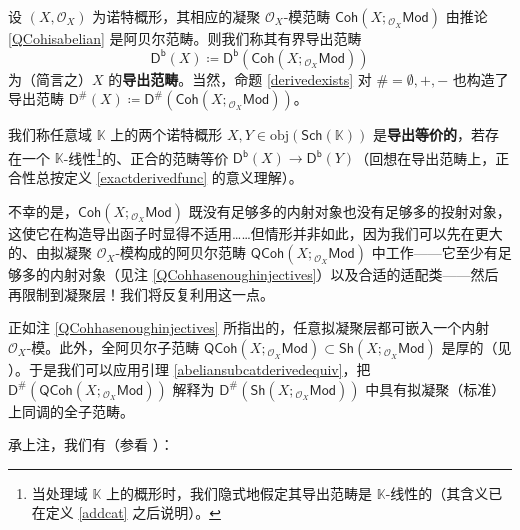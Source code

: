 \begin{Def}\label{dercatofsch}
设 $(X,\mathcal{O}_X)$ 为诺特概形，其相应的凝聚 $\mathcal{O}_X$-模范畴 $\mathsf{Coh}(X;{}_{\mathcal{O}_X}\!\mathsf{Mod})$ 由推论 \ref{QCohisabelian} 是阿贝尔范畴。则我们称其有界导出范畴
\[
\mathsf{D^b}(X)\coloneqq \mathsf{D^b}(\mathsf{Coh}(X;{}_{\mathcal{O}_X}\!\mathsf{Mod}))
\]
为（简言之）$X$ 的\textbf{导出范畴}。当然，命题 \ref{derivedexists} 对 $\#=\emptyset,+,-$ 也构造了导出范畴 $\mathsf{D^\#\!}(X)\coloneqq\mathsf{D^\#\!}(\mathsf{Coh}(X;{}_{\mathcal{O}_X}\!\mathsf{Mod}))$。

我们称任意域 $\mathbb{K}$ 上的两个诺特概形 $X,Y\in\text{obj}(\mathsf{Sch}(\mathbb{K}))$ 是\textbf{导出等价的}，若存在一个 $\mathbb{K}$-线性\footnote{当处理域 $\mathbb{K}$ 上的概形时，我们隐式地假定其导出范畴是 $\mathbb{K}$-线性的（其含义已在定义 \ref{addcat} 之后说明）。}的、正合的范畴等价 $\mathsf{D^b}(X)\rightarrow\mathsf{D^b}(Y)$（回想在导出范畴上，正合性总按定义 \ref{exactderivedfunc} 的意义理解）。
\end{Def}

不幸的是，$\mathsf{Coh}(X;{}_{\mathcal{O}_X}\!\mathsf{Mod})$ 既没有足够多的内射对象也没有足够多的投射对象，这使它在构造导出函子时显得不适用……但情形并非如此，因为我们可以先在更大的、由拟凝聚 $\mathcal{O}_X$-模构成的阿贝尔范畴 $\mathsf{QCoh}(X;{}_{\mathcal{O}_X}\!\mathsf{Mod})$ 中工作——它至少有足够多的内射对象（见注 \ref{QCohhasenoughinjectives}）以及合适的适配类——然后再限制到凝聚层！我们将反复利用这一点。

\begin{Rem}
正如注 \ref{QCohhasenoughinjectives} 所指出的，任意拟凝聚层都可嵌入一个内射 $\mathcal{O}_X$-模。此外，全阿贝尔子范畴 $\mathsf{QCoh}(X;{}_{\mathcal{O}_X}\!\mathsf{Mod})\subset\mathsf{Sh}(X;{}_{\mathcal{O}_X}\!\mathsf{Mod})$ 是厚的（见 \cite[Proposition II.5.7]{[Har77]}）。于是我们可以应用引理 \ref{abeliansubcatderivedequiv}，把 $\mathsf{D^\#\!}(\mathsf{QCoh}(X;{}_{\mathcal{O}_X}\!\mathsf{Mod}))$ 解释为 $\mathsf{D^\#\!}(\mathsf{Sh}(X;{}_{\mathcal{O}_X}\!\mathsf{Mod}))$ 中具有拟凝聚（标准）上同调的全子范畴。
\end{Rem}

承上注，我们有（参看 \cite[Proposition 3.5]{[Huy06]}）：

